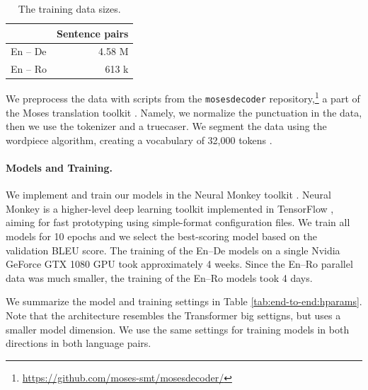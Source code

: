 \begin{table}
  \centering
  \begin{tabular}{lr}
    \toprule
     & Sentence pairs \\
    \midrule
    En -- De & 4.58 M \\
    En -- Ro & 613 k \\
    \bottomrule
  \end{tabular}

  \caption{The training data sizes. }%
  \label{tab:end-to-end:data}
\end{table}

We preprocess the data with scripts from the \texttt{mosesdecoder}
repository,\footnote{\url{https://github.com/moses-smt/mosesdecoder/}} a part
of the Moses translation toolkit \citep{koehn-etal-2007-moses}. Namely, we
normalize the punctuation in the data, then we use the tokenizer and a
truecaser. We segment the data using the wordpiece algorithm, creating a
vocabulary of 32,000 tokens \citep{wu2016google}.

\paragraph{Models and Training.}
We implement and train our models in the Neural Monkey toolkit
\citep{helcl-libovicky-2017-neural,helcl-etal-2018-neural}. Neural Monkey is a
higher-level deep learning toolkit implemented in TensorFlow
\citep{tensorflow2015-whitepaper}, aiming for fast prototyping using
simple-format configuration files. We train all models for 10 epochs and we
select the best-scoring model based on the validation BLEU score. The training
of the En--De models on a single Nvidia GeForce GTX 1080 GPU took approximately
4 weeks. Since the En--Ro parallel data was much smaller, the training of the
En--Ro models took 4 days.

We summarize the model and training settings in Table
\ref{tab:end-to-end:hparams}. Note that the architecture resembles the
Transformer big settigns, but uses a smaller model dimension. We use the same
settings for training models in both directions in both language pairs.

